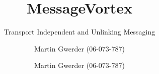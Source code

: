 \documentclass[a4paper,appendixprefix,pdfusetitle,twocolumn,fontsize=12pt,DIV=calc,12pt,draft,utf8]{\doctype} %
\title{\thetitle}
\subtitle{\thesubtitle}
\author{Martin Gwerder (06-073-787)}
\title{MessageVortex}
\subtitle{Transport Independent and Unlinking Messaging}
\author{Martin Gwerder (06-073-787)}
\date{\gitAuthorDate}
\begin{document}
%
%
\frontmatter%


\mainmatter
\startcontents








\appendix


\end{document}
